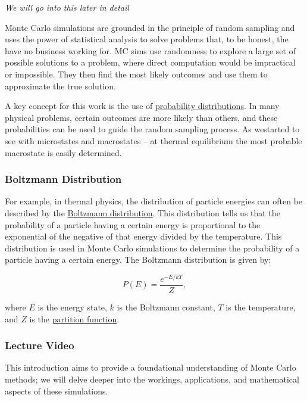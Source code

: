 \emph{We will go into this later in detail}

Monte Carlo simulations are grounded in the principle of random sampling
and uses the power of statistical analysis to solve problems that, to be
honest, the have no business working for. MC sims use randomness to
explore a large set of possible solutions to a problem, where direct
computation would be impractical or impossible. They then find the most
likely outcomes and use them to approximate the true solution.

A key concept for this work is the use of
\href{https://en.wikipedia.org/wiki/Probability_distribution}{probability
distributions}. In many physical problems, certain outcomes are more
likely than others, and these probabilities can be used to guide the
random sampling process. As westarted to see with microstates and
macrostates -- at thermal equilibrium the most probable macrostate is
easily determined.

\subsubsection{Boltzmann Distribution}\label{boltzmann-distribution}

For example, in thermal physics, the distribution of particle energies
can often be described by the
\href{https://en.wikipedia.org/wiki/Boltzmann_distribution}{Boltzmann
distribution}. This distribution tells us that the probability of a
particle having a certain energy is proportional to the exponential of
the negative of that energy divided by the temperature. This
distribution is used in Monte Carlo simulations to determine the
probability of a particle having a certain energy. The Boltzmann
distribution is given by:

\[P(E) = \frac{e^{-E/kT}}{Z},\]

where \(E\) is the energy state, \(k\) is the Boltzmann constant, \(T\)
is the temperature, and \(Z\) is the
\href{https://en.wikipedia.org/wiki/Partition_function_(statistical_mechanics)}{partition
function}.

\subsubsection{Lecture Video}\label{lecture-video}

This introduction aims to provide a foundational understanding of Monte
Carlo methods; we will delve deeper into the workings, applications, and
mathematical aspects of these simulations.

